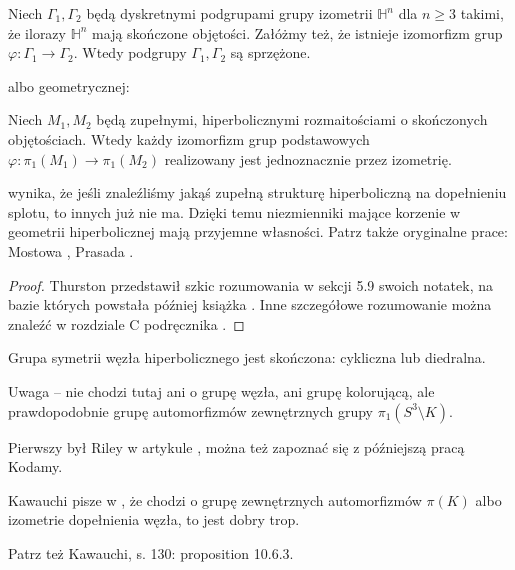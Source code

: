 \begin{theorem}
    Niech $\Gamma_1, \Gamma_2$ będą dyskretnymi podgrupami grupy izometrii $\mathbb H^n$ dla $n \ge 3$ takimi, że ilorazy $\mathbb H^n$ mają skończone objętości.
    Załóżmy też, że istnieje izomorfizm grup $\varphi \colon \Gamma_1 \to \Gamma_2$.
    Wtedy podgrupy $\Gamma_1, \Gamma_2$ są sprzężone.
\end{theorem}

albo geometrycznej:

\begin{theorem}
    Niech $M_1, M_2$ będą zupełnymi, hiperbolicznymi rozmaitościami o skończonych objętościach.
    Wtedy każdy izomorfizm grup podstawowych $\varphi \colon \pi_1(M_1) \to \pi_1(M_2)$ realizowany jest jednoznacznie przez izometrię.
\end{theorem}

wynika, że jeśli znaleźliśmy jakąś zupełną strukturę hiperboliczną na dopełnieniu splotu, to innych już nie ma. 
Dzięki temu niezmienniki mające korzenie w geometrii hiperbolicznej mają przyjemne własności.
Patrz także oryginalne prace: Mostowa \cite{mostow73}, Prasada \cite{prasad73}.

\begin{proof}
    Thurston przedstawił szkic rozumowania w sekcji 5.9 swoich notatek, na bazie których powstała później książka \cite{thurston97}.
    Inne szczegółowe rozumowanie można znaleźć w rozdziale C podręcznika \cite{benedetti92}.
\end{proof}


\begin{proposition}
    Grupa symetrii węzła hiperbolicznego jest skończona: cykliczna lub diedralna.
\end{proposition}

Uwaga -- nie chodzi tutaj ani o grupę węzła, ani grupę kolorującą, ale prawdopodobnie grupę automorfizmów zewnętrznych grupy $\pi_1(S^3 \setminus K)$.

\begin{tobedone} %
    Pierwszy był Riley w artykule \cite{riley75}, można też zapoznać się z późniejszą pracą \cite{kodama92} Kodamy.

    Kawauchi pisze w \cite[s. 130]{kawauchi96}, że chodzi o grupę zewnętrznych automorfizmów $\pi(K)$ albo izometrie dopełnienia węzła, to jest dobry trop.

    Patrz też Kawauchi, s. 130: proposition 10.6.3.
\end{tobedone} %

